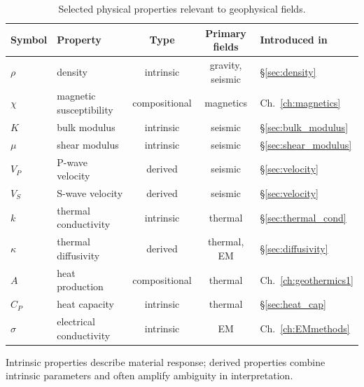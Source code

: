 \begin{table}
    \centering
    \begin{threeparttable}
    \caption{Selected physical properties relevant to geophysical fields.}
    \label{tab:prop_summary}
    \begin{tabular}{@{}llccl@{}}
        \toprule
        \textbf{Symbol} &
        \textbf{Property} &
        \textbf{Type}\tnote{a} &
        \textbf{Primary fields} &
        \textbf{Introduced in} \\
        \midrule
        $\rho$   & density & intrinsic & gravity, seismic & \S\ref{sec:density} \\
        $\chi$   & magnetic susceptibility & compositional & magnetics & Ch.~\ref{ch:magnetics} \\
        $K$      & bulk modulus & intrinsic & seismic & \S\ref{sec:bulk_modulus} \\
        $\mu$    & shear modulus & intrinsic & seismic & \S\ref{sec:shear_modulus} \\
        $V_P$    & P-wave velocity & derived & seismic & \S\ref{sec:velocity} \\
        $V_S$    & S-wave velocity & derived & seismic & \S\ref{sec:velocity} \\
        $k$      & thermal conductivity & intrinsic & thermal & \S\ref{sec:thermal_cond} \\
        $\kappa$ & thermal diffusivity & derived & thermal, EM & \S\ref{sec:diffusivity} \\
        $A$      & heat production & compositional & thermal & Ch.~\ref{ch:geothermics1} \\
        $C_P$    & heat capacity & intrinsic & thermal & \S\ref{sec:heat_cap} \\
        $\sigma$ & electrical conductivity & intrinsic & EM & Ch.~\ref{ch:EMmethods} \\
        \bottomrule
    \end{tabular}
    \begin{tablenotes}
        \item[a] Intrinsic properties describe material response; derived properties combine intrinsic parameters and often amplify ambiguity in interpretation.
    \end{tablenotes}
\end{threeparttable}
\end{table}